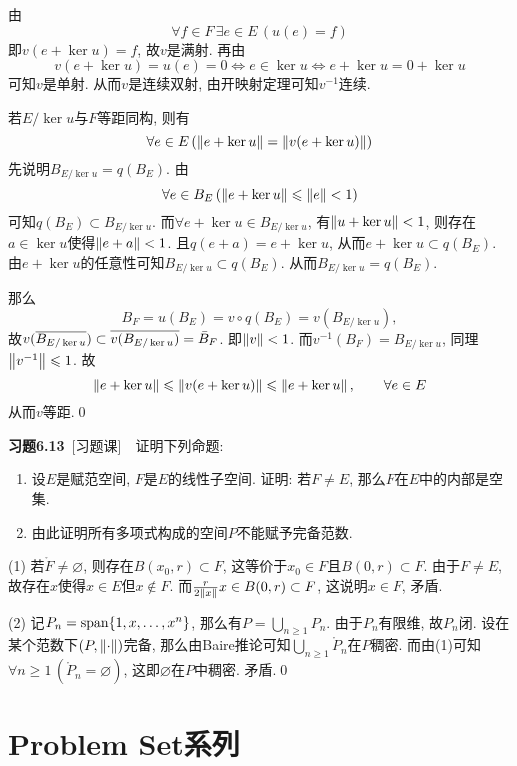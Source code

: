 \begin{Proof}
	由
	\[
	\forall f\in F\,\exists e\in E\,(u(e)=f)
	\]
	即$ v(e+\ker u)=f $, 故$ v $是满射. 再由
	\[
	v(e+\ker u)=u(e)=0\Longleftrightarrow e\in\ker u\Longleftrightarrow e+\ker u=0+\ker u
	\]
	可知$ v $是单射. 从而$ v $是连续双射, 由开映射定理可知$ v^{-1} $连续.
	
	若$ E/\ker u $与$ F $等距同构, 则有
	\[
	\forall e\in E\,(\norm{e+\ker u}=\norm{v(e+\ker u)})
	\]
	先说明$ B_{E/\ker u}=q(B_E) $. 由
	\[
	\forall e\in B_E\,(\norm{e+\ker u}\leqslant\norm{e}<1)
	\]
	可知$ q(B_E)\subset B_{E/\ker u} $. 而$ \forall e+\ker u\in B_{E/\ker u} $, 有$ \norm{u+\ker u}<1 $, 则存在$ a\in\ker u $使得$ \norm{e+a}<1 $. 且$ q(e+a)=e+\ker u $, 从而$ e+\ker u\subset q(B_E) $. 由$ e+\ker u $的任意性可知$ B_{E/\ker u}\subset q(B_E) $. 从而$ B_{E/\ker u}=q(B_E) $.
	
	那么
	\[
	B_F=u(B_E)=v\circ q(B_E)=v(B_{E/\ker u}),
	\]
	故$ v(\baro{B_{E/\ker u}})\subset\baro{v(B_{E/\ker u})}=\bar{B}_F $. 即$ \norm{v}<1 $. 而$ v^{-1}(B_F)=B_{E/\ker u} $, 同理$ \norm{v^{-1}}\leqslant 1 $. 故
	\[
	\norm{e+\ker u}\leqslant\norm{v(e+\ker u)}\leqslant\norm{e+\ker u},\qquad \forall e\in E
	\]
	从而$ v $等距.\qed
	\end{Proof}
	
	\textbf{习题6.13}\ [习题课]\ \ 证明下列命题:
	\begin{enumerate}[(1)]
	\item 设$ E $是赋范空间, $ F $是$ E $的线性子空间. 证明: 若$ F\ne E $, 那么$ F $在$ E $中的内部是空集.
	\item 由此证明所有多项式构成的空间$ P $不能赋予完备范数.
	\end{enumerate}
	\begin{Proof}
	(1) 若$ \mathring{F}\ne\varnothing $, 则存在$ B(x_0,r)\subset F $, 这等价于$ x_0\in F $且$ B(0,r)\subset F $. 由于$ F\ne E $, 故存在$ x $使得$ x\in E $但$ x\notin F $. 而$ \frac{r}{2\norm{x}}x\in B(0,r)\subset F $, 这说明$ x\in F $, 矛盾.
	
	(2) 记$ P_n=\Span\{ 1,x,\dots,x^n \} $, 那么有$ P=\bigcup_{n\geqslant 1}P_n $. 由于$ P_n $有限维, 故$ P_n $闭. 设在某个范数下$ (P,\norm{\cdot}) $完备, 那么由Baire推论可知$ \bigcup_{n\geqslant 1}\mathring{P}_n $在$ P $稠密. 而由(1)可知$ \forall n\geqslant 1\,(\mathring{P}_n=\varnothing) $, 这即$ \varnothing $在$ P $中稠密. 矛盾.\qed
	\end{Proof}

\section{Problem Set系列}

